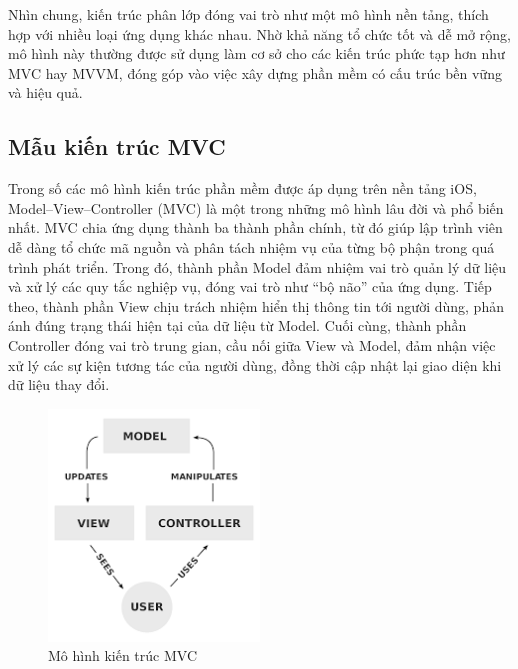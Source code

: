     \begin{flushleft}
        \hspace*{0.8cm}Nhìn chung, kiến trúc phân lớp đóng vai trò như một mô hình nền tảng, thích hợp với nhiều loại ứng dụng khác nhau. Nhờ khả năng tổ chức tốt và dễ mở rộng, mô hình này thường được sử dụng làm cơ sở cho các kiến trúc phức tạp hơn như MVC hay MVVM, đóng góp vào việc xây dựng phần mềm có cấu trúc bền vững và hiệu quả.
    \end{flushleft}

\subsection{Mẫu kiến trúc MVC}
\renewcommand{\labelitemi}{--}    
    \begin{flushleft}
        \hspace*{0.8cm}Trong số các mô hình kiến trúc phần mềm được áp dụng trên nền tảng iOS, Model–View–Controller (MVC) là một trong những mô hình lâu đời và phổ biến nhất. MVC chia ứng dụng thành ba thành phần chính, từ đó giúp lập trình viên dễ dàng tổ chức mã nguồn và phân tách nhiệm vụ của từng bộ phận trong quá trình phát triển. Trong đó, thành phần Model đảm nhiệm vai trò quản lý dữ liệu và xử lý các quy tắc nghiệp vụ, đóng vai trò như “bộ não” của ứng dụng. Tiếp theo, thành phần View chịu trách nhiệm hiển thị thông tin tới người dùng, phản ánh đúng trạng thái hiện tại của dữ liệu từ Model. Cuối cùng, thành phần Controller đóng vai trò trung gian, cầu nối giữa View và Model, đảm nhận việc xử lý các sự kiện tương tác của người dùng, đồng thời cập nhật lại giao diện khi dữ liệu thay đổi.
    \end{flushleft}

\begin{figure}[H]
    \centering
    \includegraphics[width=0.5\textwidth]{images/mvc.png}
    \caption{Mô hình kiến trúc MVC}
    \label{fig:fig12}
  \end{figure}

